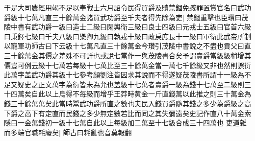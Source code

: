 于是大司農經用竭不足以奉戰士六月詔令民得買爵及贖禁錮免臧罪置賞官名曰武功爵級十七萬凡直三十餘萬金諸買武功爵至千夫者得先除為吏|{
	禁錮重擊也臣瓚曰茂陵中書有武功爵一級曰造士二級曰閑輿衛三級曰良士四級曰元戎士五級曰官首六級曰秉鐸七級曰千夫八級曰樂卿九級曰執戎十級曰政戾庶長十一級曰軍衛此武帝所制以寵軍功師古曰下云級十七萬凡直三十餘萬金今瓚引茂陵中書說之不盡也貢父曰直三十餘萬金其價之差殊不可詳也或說七當作一與茂陵書合矣予謂賣爵當級級稍增其價豈可例云級十七萬若每級十七萬比至三十餘萬金當一萬七千餘級又非也然則誤衍此萬字盖武功爵其級十七參考顔劉注皆因求其說而不得遂疑茂陵書所謂十一級為不足又疑史之正文萬字為衍皆未為允也盖級十七萬者賣爵一級為錢十七萬至二級則三十四萬矣自此以上烏得不每級而增乎王莽時黄金一斤直錢萬以此推之則三十萬金為錢三十餘萬萬矣此當時鬻武功爵所直之數也夫民入錢買爵隨其錢之多少為爵級之高下爵之高下有定直而民錢之多少無定數若比而同之其失彌遠矣史記作直八十萬金索隱曰一金萬錢初一級十七萬自此以上每級加二萬至十七級合成三十四萬也}
吏道雜而多端官職耗廢矣|{
	師古曰耗亂也音莫報翻}


